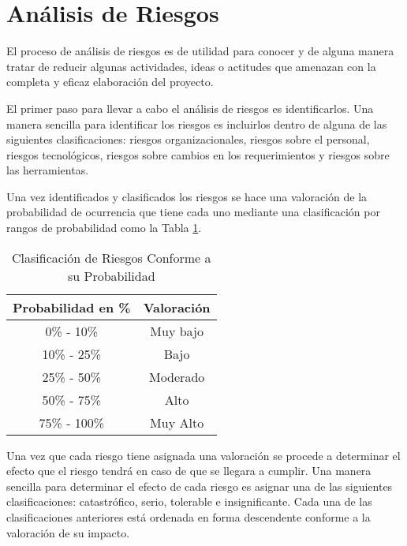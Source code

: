 \section{Análisis de Riesgos}

El proceso de análisis de riesgos es de utilidad para conocer y de alguna manera tratar de reducir algunas actividades, ideas o actitudes que amenazan con la completa y eficaz elaboración del proyecto.

El primer paso para llevar a cabo el análisis de riesgos es identificarlos. Una manera sencilla para identificar los riesgos es incluirlos dentro de alguna de las siguientes clasificaciones: riesgos organizacionales, riesgos sobre el personal, riesgos tecnológicos, riesgos sobre cambios en los requerimientos y riesgos sobre las herramientas.

Una vez identificados y clasificados los riesgos se hace una valoración de la probabilidad de ocurrencia que tiene cada uno mediante una clasificación por rangos de probabilidad como la Tabla \ref{tab:probabilidadRiesgos}.

\begin{table}[h]
	\begin{center}
		\begin{tabular}{|c|c|}
			\hline \rowcolor[RGB]{51,153,255} 
				\textcolor{blanco}{\bf Probabilidad en \%} &
				\textcolor{blanco}{\bf Valoración} \\
			\hline 
				0\% - 10\% &
				Muy bajo \\
      		\hline \rowcolor[RGB]{240,248,255}
				10\% - 25\% &
				Bajo \\
			\hline 
				25\% - 50\% &
				Moderado \\ 
			\hline \rowcolor[RGB]{240,248,255}
				50\% - 75\% &
				Alto \\ 
			\hline
				75\% - 100\% &
				Muy Alto \\ 
			\hline
		\end{tabular}
	\end{center}
	\caption[Clasificación de Riesgos Conforme a su Probabilidad]{Clasificación de Riesgos Conforme a su Probabilidad} 
	\label{tab:probabilidadRiesgos}
\end{table}

Una vez que cada riesgo tiene asignada una valoración se procede a determinar el efecto que el riesgo tendrá en caso de que se llegara a cumplir. Una manera sencilla para determinar el efecto de cada riesgo es asignar una de las siguientes clasificaciones: catastrófico, serio, tolerable e insignificante. Cada una de las clasificaciones anteriores está ordenada en forma descendente conforme a la valoración de su impacto.

